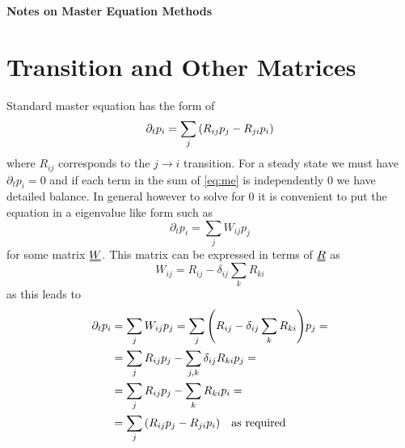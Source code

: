 \documentclass[11pt]{article}
\newcommand{\duf}[2]{\stackunder[0.5pt]{\stackunder[0.8pt]{\stackunder[1pt]{\ensuremath{#1}}{\rule{\widthof{\ensuremath{#2}}*\real{0.9}}{.1ex}}}{\rule{\widthof{\ensuremath{#2}}*\real{0.9}}{.1ex}}}{}}
\newcommand{\du}[1]{\duf{#1}{#1}}
\begin{document}
\begin{center}
    \LARGE
    \textbf{Notes on Master Equation Methods}
    \vspace{1em}
\end{center}

\section{Transition and Other Matrices}
Standard master equation has the form of
\begin{equation}\label{eq:me}
    \partial_t p_i = \sum_j \qty(R_{ij}p_j - R_{ji}p_i)
\end{equation}
where $R_{ij}$ corresponds to the $j \rightarrow i$ transition.
For a steady state we must have $\partial_t p_i=0$ and if each term in the sum of \cref{eq:me} is independently 0 we have detailed balance.
In general however to solve for 0 it is convenient to put the equation in a eigenvalue like form such as
\begin{equation}
    \partial_t p_i = \sum_j W_{ij}p_j
\end{equation}
for some matrix $\du{W}$.
This matrix can be expressed in terms of $\du{R}$ as
\begin{equation}
    W_{ij} = R_{ij}-\delta_{ij}\sum_k R_{ki}
\end{equation}
as this leads to
\begin{align}
    \partial_t p_i &= \sum_j W_{ij}p_j = \sum_j \qty(R_{ij}-\delta_{ij}\sum_k R_{ki}) p_j = \\
    &= \sum_j R_{ij}p_j - \sum_{j,k}\delta_{ij} R_{ki} p_j = \\
    &= \sum_j R_{ij}p_j - \sum_{k} R_{ki} p_i = \\
    &= \sum_j \qty(R_{ij}p_j - R_{ji} p_i) \qq{as required}
\end{align}
\end{document}
